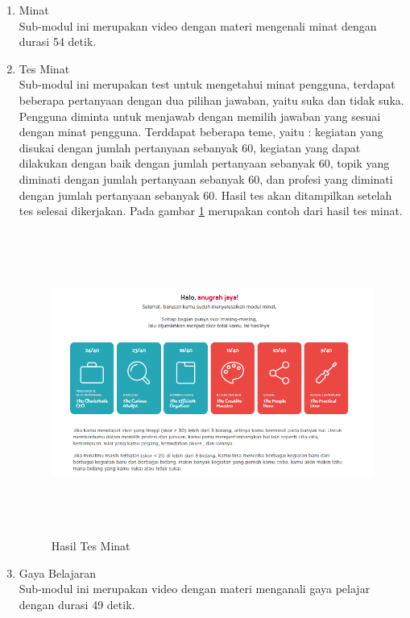 \begin{enumerate}
\begin{enumerate}
        \item Minat \\
             Sub-modul ini merupakan video dengan materi mengenali minat dengan durasi 54 detik. 
            
        \item Tes Minat \\
            Sub-modul ini merupakan test untuk mengetahui minat pengguna, terdapat beberapa pertanyaan dengan dua pilihan jawaban, yaitu suka dan tidak suka. Pengguna diminta untuk menjawab dengan memilih jawaban yang sesuai dengan minat pengguna. Terddapat beberapa teme, yaitu : kegiatan yang disukai dengan jumlah pertanyaan sebanyak 60, kegiatan yang dapat dilakukan dengan baik dengan jumlah pertanyaan sebanyak 60, topik yang diminati dengan jumlah pertanyaan sebanyak 60, dan profesi yang diminati dengan jumlah pertanyaan sebanyak 60. Hasil tes akan ditampilkan setelah tes selesai dikerjakan. Pada gambar \ref{fig:hasil tes minat} merupakan contoh dari hasil tes minat.
            
            \begin{figure}[H]
                \centering
                \includegraphics[width = 12cm, height = 10cm]{doc/DokumenSkripsi/Gambar/gambar36.PNG}
                \caption{Hasil Tes Minat}
                \label{fig:hasil tes minat}
            \end{figure}
        
        \item Gaya Belajaran \\
            Sub-modul ini merupakan video dengan materi menganali gaya pelajar dengan durasi 49 detik.
            

\end{enumerate}
\end{enumerate}

